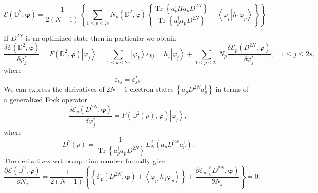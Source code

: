 \documentclass[aps,preprint]{revtex4}%
\begin{document}
\begin{equation}
\mathcal{E}\left(  \mathbb{D}^{2},\mathbf{\varphi}\right)  =\frac{1}{2\left(
N-1\right)  }\left\{  \sum_{1\leq p\leq2s}N_{p}\left(  \mathbb{D}%
^{2},\mathbf{\varphi}\right)  \left\{  \frac{\operatorname{Tr}\left\{
a_{p}^{\dagger}Ha_{p}D^{2N}\right\}  }{\operatorname{Tr}\left\{
a_{p}^{\dagger}a_{p}D^{2N}\right\}  }-\left\langle \left.  \varphi
_{p}\right\vert h_{1}\varphi_{p}\right\rangle \right\}  \right\}
\end{equation}


If $D^{2N}$ is an optimized state then in particular we obtain
\begin{equation}
\frac{\delta\mathcal{E}\left(  \mathbb{D}^{2},\mathbf{\varphi}\right)
}{\delta\varphi_{j}^{\ast}}=F\left(  \mathbb{D}^{2},\mathbf{\varphi}\right)
\left\vert \varphi_{j}\right\rangle =\sum_{1\leq k\leq2s}\left\vert
\varphi_{k}\right\rangle \varepsilon_{kj}=h_{1}\left\vert \varphi
_{j}\right\rangle +\sum_{1\leq p\leq2s}N_{p}\frac{\delta\mathcal{E}_{p}\left(
D^{2N},\mathbf{\varphi}\right)  }{\delta\varphi_{j}^{\ast}};\quad1\leq
j\leq2s,
\end{equation}
where
\begin{equation}
\varepsilon_{kj}=\varepsilon_{jk}^{\ast}.
\end{equation}
We can express the derivatives of $2N-1$ electron states $\left\{  a_{p}%
D^{2N}a_{p}^{\dagger}\right\}  $ in terms of a generalized Fock operator%
\begin{equation}
\frac{\delta\mathcal{E}_{p}\left(  D^{2N},\mathbf{\varphi}\right)  }%
{\delta\varphi_{j}^{\ast}}=F\left(  \mathbb{D}^{2}\left(  p\right)
,\mathbf{\varphi}\right)  \left\vert \varphi_{j}\right\rangle ,
\end{equation}
where
\begin{equation}
D^{2}\left(  p\right)  =\frac{1}{\operatorname{Tr}\left\{  a_{p}^{\dagger
}a_{p}D^{2N}\right\}  }L_{N}^{2}\left(  a_{p}D^{2N}a_{p}^{\dagger}\right)  .
\end{equation}
The derivatives wrt occupation number formally give
\begin{equation}
\frac{\partial\mathcal{E}\left(  \mathbb{D}^{2},\mathbf{\varphi}\right)
}{\partial N_{j}}=\frac{1}{2\left(  N-1\right)  }\left\{  \left\{
\mathcal{E}_{p}\left(  D^{2N},\mathbf{\varphi}\right)  +\left\langle \left.
\varphi_{p}\right\vert h_{1}\varphi_{p}\right\rangle \right\}  +\frac
{\partial\mathcal{E}_{p}\left(  D^{2N},\mathbf{\varphi}\right)  }{\partial
N_{j}}\right\}  =0.
\end{equation}
\end{document}

